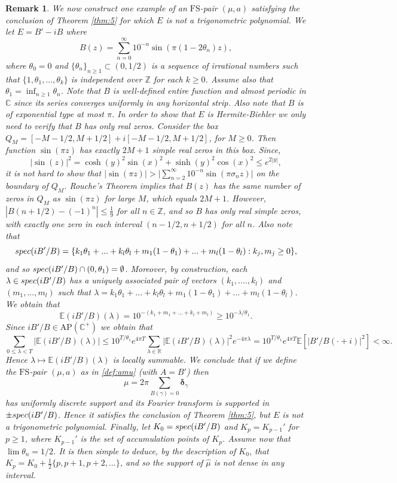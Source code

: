 \documentclass[a4paper,reqno,12pt]{amsart}
\newtheorem{remark}{Remark}
\newcommand{\E}{\mathcal{E}}
\renewcommand{\H}{\mathbb{C}^+}
\newcommand{\z}{\mathbb{Z}}
\renewcommand{\r}{\mathbb{R}}
\newcommand{\cp}{\mathbb{C}} %
\newcommand{\ft}{\widehat}
\newcommand{\bo}{\boldsymbol}
\newcommand{\la}{\lambda}
\newcommand{\ga}{\gamma}
\newcommand{\si}{\sigma}
\newcommand{\1}{{\bf 1}}
\newcommand{\apc}{\mathrm{AP}(\H)}
\newcommand{\fs}{\mathrm{FS}}
\renewcommand{\E}{\mathbb{E}}
\renewcommand{\1}{{\bo 1}}
\newcommand{\del}{{\bo \delta}}
\newcommand{\spec}{{\rm spec}}
\begin{document}
\begin{remark}
We now construct one example of an $\fs$-pair $(\mu,a)$ satisfying the conclusion of Theorem \ref{thm:5} for which $E$ is not a trigonometric polynomial. We let $E=B'-iB$ where
$$
B(z) = \sum_{n=0}^\infty 10^{-n} \sin(\pi (1-2\theta_n) z),
$$
where $\theta_0=0$ and $\{\theta_n\}_{n\geq 1}\subset (0,1/2)$ is a sequence of irrational numbers such that $\{1,\theta_1,...,\theta_k\}$ is independent over $\z$ for each $k\geq 0$. Assume also that $\theta_1=\inf_{n\geq 1} \theta_n$. Note that $B$ is well-defined entire function and almost periodic in $\cp$ since its series converges uniformly in any horizontal strip. Also note that $B$ is of exponential type at most $\pi$. In order to show that $E$ is Hermite-Biehler we only need to verify that $B$ has only real zeros. Consider the box $Q_M=[-M-1/2,M+1/2] + i[-M-1/2,M+1/2]$, for $M\geq 0$. Then function $\sin(\pi z)$ has exactly $2M+1$ simple real zeros in this box. Since, 
$$
|\sin(z)|^2 = \cosh(y)^2 \sin(x)^2 + \sinh(y)^2 \cos(x)^2 \leq e^{2|y|},
$$
it is not hard to show that 
$|\sin(\pi z)| >\bigg| \sum_{n=2}^\infty 10^{-n} \sin(\pi \si_n z)\bigg|$
on the boundary of $Q_M$. Rouche's Theorem implies that $B(z)$ has the same number of zeros in $Q_M$ as $\sin(\pi z)$ for large $M$, which equals $2M+1$. However, $|B(n+1/2)-(-1)^n|\leq \frac19$ for all $n\in \z$, and so $B$ has only real simple zeros, with exactly one zero in each interval $(n-1/2,n+1/2)$ for all $n$. Also note that $$\spec(iB'/B)=\{k_1\theta_1 + ...+k_l\theta_l +m_1(1-\theta_1)+...+m_l(1-\theta_l) : k_j,m_j\geq 0\},$$ and so $\spec(iB'/B) \cap (0,\theta_1)=\emptyset$.
Moreover, by construction, each $\la\in \spec(iB'/B)$ has a uniquely associated pair of vectors $(k_1,....,k_l)$ and $(m_1,...,m_l)$ such that $\la=k_1\theta_1 + ...+k_l\theta_l +m_1(1-\theta_1)+...+m_l(1-\theta_l)$. We obtain that
$$
\E(iB'/B)(\la) = 10^{-(k_1+m_1+...+k_l+m_l)} \geq 10^{-\la/\theta_1}.
$$
Since $iB'/B\in \apc$ we obtain that 
$$
\sum_{0\leq \la<T} |\E(iB'/B)(\la)| \leq 10^{T/\theta_1}e^{4\pi T}\sum_{\la\in \r} |\E(iB'/B)(\la)|^2e^{-4\pi \la}=10^{T/\theta_1}e^{4\pi T}\E[|B'/B(\cdot+i)|^2]<\infty.
$$
Hence $\la\mapsto \E(iB'/B)(\la)$ is locally summable. We conclude that if we define the $\fs$-pair $(\mu,a)$ as in  \eqref{def:amu} (with $A=B'$) then
$$
\mu=2\pi \sum_{B(\ga)=0} \del_\ga
$$
has uniformly discrete support and its Fourier transform is supported in $\pm \spec(iB'/B)$. Hence it satisfies the conclusion of Theorem \ref{thm:5}, but $E$ is not a trigonometric polynomial. Finally, let $K_0=\spec(iB'/B)$ and $K_{p}=K_{p-1}'$ for $p\geq 1$, where $K_{p-1}'$ is the set of accumulation points of $K_p$. Assume now that $\lim \theta_n=1/2$. It is then simple to deduce, by the description of $K_0$, that $K_p = K_0+\frac12\{p,p+1,p+2,...\}$, and so the support of $\ft \mu$ is not dense in any interval.
\end{remark}
\end{document}
